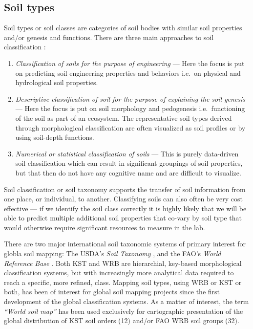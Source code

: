 \documentclass[11pt]{krantz}
\theoremstyle{definition}
\theoremstyle{definition}
\theoremstyle{definition}
\theoremstyle{remark}
\begin{document}
\hypertarget{soil-types}{%
\subsection{Soil types}\label{soil-types}}

Soil types or soil classes are categories of soil bodies with similar
soil properties and/or genesis and functions. There are three main
approaches to soil classification \citep{eswaran2010soil, buol2011soil}:

\begin{enumerate}
\def\labelenumi{\arabic{enumi}.}
\item
  \emph{Classification of soils for the purpose of engineering} --- Here
  the focus is put on predicting soil engineering properties and
  behaviors i.e.~on physical and hydrological soil properties.
\item
  \emph{Descriptive classification of soil for the purpose of explaining
  the soil genesis} --- Here the focus is put on soil morphology and
  pedogenesis i.e.~functioning of the soil as part of an ecosystem. The
  representative soil types derived through morphological classification
  are often visualized as soil profiles or by using soil-depth
  functions.
\item
  \emph{Numerical or statistical classification of soils} --- This is
  purely data-driven soil classification which can result in significant
  groupings of soil properties, but that then do not have any cognitive
  name and are difficult to visualize.
\end{enumerate}

Soil classification or soil taxonomy supports the transfer of soil
information from one place, or individual, to another. Classifying soils
can also often be very cost effective --- if we identify the soil class
correctly it is highly likely that we will be able to predict multiple
additional soil properties that co-vary by soil type that would
otherwise require significant resources to measure in the lab.

There are two major international soil taxonomic systems of primary
interest for globla soil mapping: The USDA's \emph{Soil Taxonomy}
\citep{agriculture2010keys}, and the FAO's \emph{World Reference Base}
\citep{FAO2006WRB}. Both KST and WRB are hierarchial, key-based
morphological classification systems, but with increasingly more
analytical data required to reach a specific, more refined, class.
Mapping soil types, using WRB or KST or both, has been of interest for
global soil mapping projects since the first development of the global
classification systems. As a matter of interest, the term \emph{``World
soil map''} has been used exclusively for cartographic presentation of
the global distribution of KST soil orders (12) and/or FAO WRB soil
groups (32).
\end{document}
